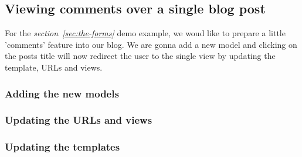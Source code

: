 \subsection{Viewing comments over a single blog post}
    For the \emph{section~\ref{sec:the-forms}} demo example, 
    we woud like to prepare a little 'comments' feature into our blog.
    We are gonna add a new  model and clicking on the posts title
    will now redirect the user to the single view by updating the template, URLs and views.

    \subsubsection{Adding the new models}
    \subsubsection{Updating the URLs and views}
    \subsubsection{Updating the templates}

